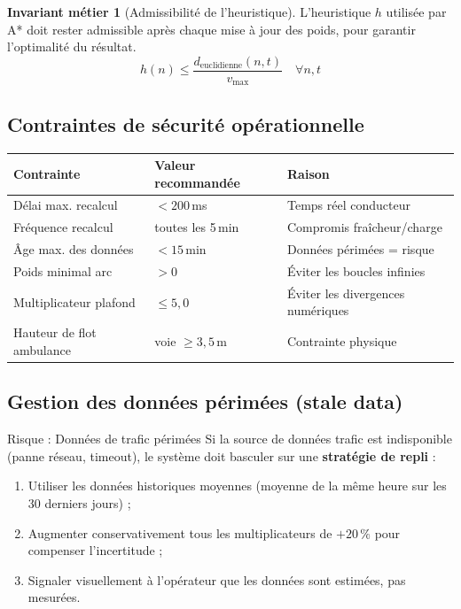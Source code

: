 \documentclass[12pt,a4paper]{article}
\theoremstyle{definition}
\newtheorem{invariant}{Invariant métier}[section]
\theoremstyle{remark}
\begin{document}
\begin{invariant}[Admissibilité de l'heuristique]
  L'heuristique $h$ utilisée par A* doit rester admissible après chaque
  mise à jour des poids, pour garantir l'optimalité du résultat.
  $$
  h(n) \leq \frac{d_{\text{euclidienne}}(n, t)}{v_{\max}} \quad \forall n,t
  $$
\end{invariant}

\subsection{Contraintes de sécurité opérationnelle}

\begin{center}
\begin{tabular}{lll}
  \toprule
  \textbf{Contrainte} & \textbf{Valeur recommandée} & \textbf{Raison} \\
  \midrule
  Délai max. recalcul & $< 200$\,ms & Temps réel conducteur \\
  Fréquence recalcul & toutes les 5\,min & Compromis fraîcheur/charge \\
  Âge max. des données & $< 15$\,min & Données périmées = risque \\
  Poids minimal arc & $> 0$ & Éviter les boucles infinies \\
  Multiplicateur plafond & $\leq 5{,}0$ & Éviter les divergences numériques \\
  Hauteur de flot ambulance & voie $\geq 3{,}5$\,m & Contrainte physique \\
  \bottomrule
\end{tabular}
\end{center}

\subsection{Gestion des données périmées (stale data)}

\begin{alertbox}{Risque : Données de trafic périmées}
Si la source de données trafic est indisponible (panne réseau, timeout),
le système doit basculer sur une \textbf{stratégie de repli} :
\begin{enumerate}
  \item Utiliser les données historiques moyennes (moyenne de la même
        heure sur les 30 derniers jours) ;
  \item Augmenter conservativement tous les multiplicateurs de $+20\,\%$
        pour compenser l'incertitude ;
  \item Signaler visuellement à l'opérateur que les données sont
        estimées, pas mesurées.
\end{enumerate}
\end{alertbox}
\end{document}
